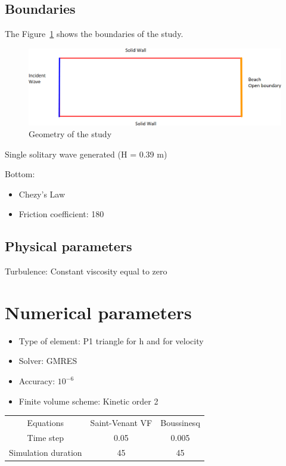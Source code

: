\subsection{Boundaries}

The Figure~\ref{fig:triang:boundaries} shows the boundaries of the study.
\begin{figure}
\centering
\includegraphics[width=.6\textwidth]{img/boundaries.png}
\caption{Geometry of the study}\label{fig:triang:boundaries}
\end{figure}

Single solitary wave generated (H = 0.39 m)

Bottom:
\begin{itemize}
  \item Chezy's Law
  \item Friction coefficient: 180
\end{itemize}

\subsection{Physical parameters}

Turbulence: Constant viscosity equal to zero

\section{Numerical parameters}

\begin{itemize}
  \item Type of element: P1 triangle for h and for velocity
  \item Solver: GMRES
  \item Accuracy: $10^{-6}$
  \item Finite volume scheme: Kinetic order 2
\end{itemize}

\begin{table}[H]
  \begin{center}

    \begin{tabular*}{.9\textwidth}{|c|c|c|}
  \hline
  Equations & Saint-Venant VF & Boussinesq \\
  Time step & 0.05 & 0.005 \\
  Simulation duration & 45 & 45 \\
  \hline
\end{tabular*}
  \end{center}
\end{table}

